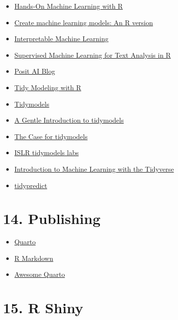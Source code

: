 \documentclass[
  letterpaper,
  DIV=11,
  numbers=noendperiod]{scrreprt}
\providecommand{\tightlist}{%
  \setlength{\itemsep}{0pt}\setlength{\parskip}{0pt}}\usepackage{longtable,booktabs,array}
\begin{document}
\begin{itemize}
\tightlist
\item
  \href{https://bradleyboehmke.github.io/HOML/}{Hands-On Machine
  Learning with R}
\item
  \href{https://rpubs.com/eR_ic/exploRe}{Create machine learning models:
  An R version}
\item
  \href{https://advanced-ds-in-r.netlify.app/posts/2021-03-31-imllocal/}{Interpretable
  Machine Learning}
\item
  \href{https://smltar.com/}{Supervised Machine Learning for Text
  Analysis in R}
\item
  \href{https://blogs.rstudio.com/ai/}{Posit AI Blog}
\item
  \href{https://www.tmwr.org/}{Tidy Modeling with R}
\item
  \href{https://www.tidymodels.org/}{Tidymodels}
\item
  \href{https://rviews.rstudio.com/2019/06/19/a-gentle-intro-to-tidymodels/}{A
  Gentle Introduction to tidymodels}
\item
  \href{https://rviews.rstudio.com/2020/04/21/the-case-for-tidymodels/}{The
  Case for tidymodels}
\item
  \href{https://emilhvitfeldt.github.io/ISLR-tidymodels-labs/index.html}{ISLR
  tidymodels labs}
\item
  \href{https://education.rstudio.com/blog/2020/02/conf20-intro-ml/}{Introduction
  to Machine Learning with the Tidyverse}
\item
  \href{https://tidypredict.tidymodels.org/}{tidypredict}
\end{itemize}

\section{14. Publishing}\label{publishing}

\begin{itemize}
\tightlist
\item
  \href{https://quarto.org/}{Quarto}
\item
  \href{https://rmarkdown.rstudio.com/}{R Markdown}
\item
  \href{https://github.com/mcanouil/awesome-quarto}{Awesome Quarto}
\end{itemize}

\section{15. R Shiny}\label{r-shiny}
\end{document}
